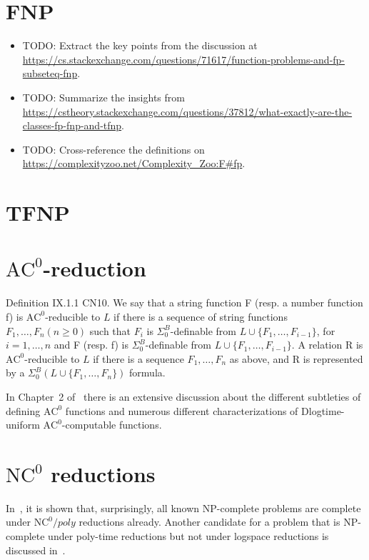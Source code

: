 \section{FNP}
\begin{itemize}
\item TODO: Extract the key points from the discussion at \url{https://cs.stackexchange.com/questions/71617/function-problems-and-fp-subseteq-fnp}.
\item TODO: Summarize the insights from \url{https://cstheory.stackexchange.com/questions/37812/what-exactly-are-the-classes-fp-fnp-and-tfnp}.
\item TODO: Cross-reference the definitions on \url{https://complexityzoo.net/Complexity_Zoo:F#fp}.
\end{itemize}


\section{TFNP}
\label{sec:complexity-class-tfnp}

\section{\texorpdfstring{$\text{AC}^0$-reduction}{AC\string^0-reduction}}
\label{sec:ac0red}
Definition IX.1.1 CN10. We say that a string function F
(resp. a number function f) is $\text{AC}^0$-reducible to $L$ if there is a sequence
of string functions $F_1, \dots, F_n (n \geqslant 0)$ such that
$F_i$ is $\Sigma^B_0$-definable from $L \cup \{F_1, \dots , F_{i-1}\}$, for $i = 1, \dots, n$
and F (resp. f) is $\Sigma^B_0$-definable from $L \cup \{F_1, \dots , F_{i-1}\}$. A relation R is
$\text{AC}^0$-reducible to $L$ if there is a sequence $F_1, \dots, F_n$ as above, and R is
represented by a $\Sigma^B_0(L \cup \{F_1, \dots, F_n\})$ formula.

In Chapter~2 of~\cite{edbd4873718c414f90d22dadf0dba2b1} there is an extensive discussion about
the different subtleties of defining $\text{AC}^0$ functions and numerous different characterizations
of Dlogtime-uniform $\text{AC}^0$-computable functions.


\section{\texorpdfstring{$\text{NC}^0$}{NC\string^0} reductions}
In~\cite{edbd4873718c414f90d22dadf0dba2b1}, it is shown that, surprisingly, all known NP-complete problems
are complete under $\text{NC}^0/poly$ reductions already. Another candidate for a problem that is NP-complete
under poly-time reductions but not under logspace reductions is discussed in~\cite{18631}.

